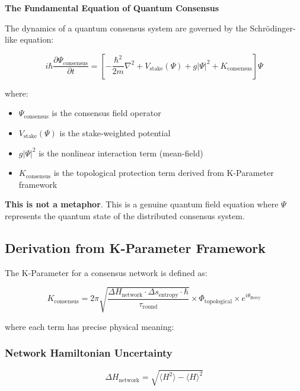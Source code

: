 \documentclass[11pt,a4paper,twoside]{article}
\begin{document}
\begin{diracbox}
\textbf{The Fundamental Equation of Quantum Consensus}

The dynamics of a quantum consensus system are governed by the Schrödinger-like equation:

\begin{equation}
\boxed{i\hbar\frac{\partial\Psi_{\text{consensus}}}{\partial t} = \left[-\frac{\hbar^2}{2m}\nabla^2 + V_{\text{stake}}(\Psi) + g|\Psi|^2 + K_{\text{consensus}}\right]\Psi}
\end{equation}

where:
\begin{itemize}
    \item $\Psi_{\text{consensus}}$ is the consensus field operator
    \item $V_{\text{stake}}(\Psi)$ is the stake-weighted potential
    \item $g|\Psi|^2$ is the nonlinear interaction term (mean-field)
    \item $K_{\text{consensus}}$ is the topological protection term derived from K-Parameter framework
\end{itemize}

\textbf{This is not a metaphor}. This is a genuine quantum field equation where $\Psi$ represents the quantum state of the distributed consensus system.
\end{diracbox}

\subsection{Derivation from K-Parameter Framework}

The K-Parameter for a consensus network is defined as:

\begin{equation}
K_{\text{consensus}} = 2\pi\sqrt{\frac{\Delta H_{\text{network}} \cdot \Delta s_{\text{entropy}} \cdot \hbar}{\tau_{\text{round}}}} \times \Phi_{\text{topological}} \times e^{i\theta_{\text{Berry}}}
\end{equation}

where each term has precise physical meaning:

\subsubsection{Network Hamiltonian Uncertainty}

\begin{equation}
\Delta H_{\text{network}} = \sqrt{\langle H^2 \rangle - \langle H \rangle^2}
\end{equation}
\end{document}
